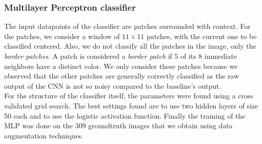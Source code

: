 \documentclass[10pt,conference,compsocconf]{IEEEtran}
\begin{document}
\subsubsection{Multilayer Perceptron classifier}
The input datapoints of the classifier are patches surrounded with context. For the patches, we consider a window of $11\times11$ patches, with the current one to be classified centered. Also, we do not classify all the patches in the image, only the \textit{border patches}. A patch is considered a \textit{border patch} if 5 of its 8 immediate neighbors have a distinct color. We only consider these patches because we observed that the other patches are generally correctly classified as the raw output of the CNN is not so noisy compared to the baseline's output.\\
For the structure of the classifier itself, the parameters were found using a cross validated grid search. The best settings found are to use two hidden layers of size 50 each and to use the logistic activation function. Finally the training of the MLP was done on the 309 groundtruth images that we obtain using data augmentation techniques.
\end{document}
